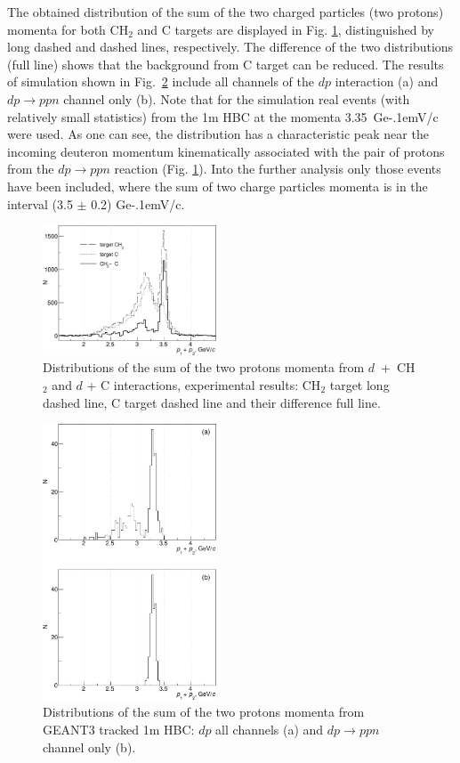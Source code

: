\documentclass[twocolumn,epjc3]{svjour3}
\newcommand{\dpfrag} {\ensuremath{dp \rightarrow ppn}\xspace}
\newcommand{\GeVc}   {Ge\kern-.1emV/c\xspace}
\begin{document}
The obtained distribution of the sum of the two charged particles (two protons)
momenta for both CH$_2$ and C targets are displayed in Fig. \ref{fig:p1p2exp},
distinguished by long dashed and dashed lines, respectively. The difference of
the two distributions (full line) shows that the background from C target can be
reduced. The results of simulation shown in Fig.~\ref{fig:p1p2sim} include all
channels of the $dp$ interaction (a) and \dpfrag channel only (b). Note that for
the simulation real events (with relatively small statistics) from the 1m HBC at
the momenta 3.35~\GeVc were used. As one can see, the distribution has a
characteristic peak near the incoming deuteron momentum kinematically associated
with the pair of protons from the \dpfrag reaction (Fig. \ref{fig:p1p2exp}).
Into the further analysis only those events have been included, where the sum of
two charge particles momenta is in the interval (3.5 $\pm$ 0.2) \GeVc.

\begin{figure}[t]
  \centering
  \includegraphics[width=0.46\textwidth]{p1_plus_p2_1.pdf}    %
  \caption{Distributions of the sum of the two protons momenta from
    $d$~+~CH$_{2}$ and $d$ + C interactions, experimental results: CH$_2$ target
    long dashed line, C target dashed line and their difference full line.}
  \label{fig:p1p2exp}
\end{figure}
\begin{figure}[!h]
  \centering
  \includegraphics[width=0.46\textwidth]{p1_plus_p2_2.pdf}    %
  \caption{Distributions of the sum of the two protons momenta from GEANT3
    tracked 1m HBC: $dp$ all channels (a) and \dpfrag channel only (b).}
  \label{fig:p1p2sim}
\end{figure}
\end{document}
